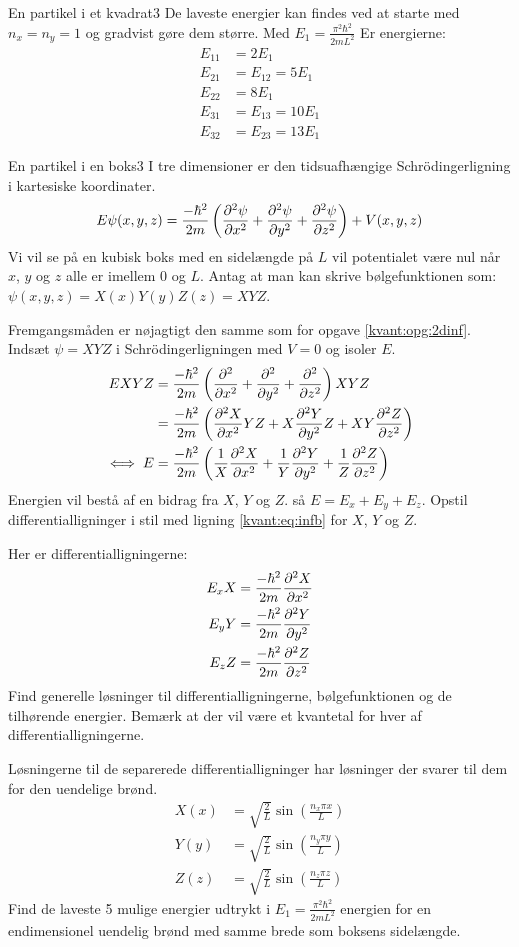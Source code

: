\begin{opgave}{En partikel i et kvadrat}{3}
De laveste energier kan findes ved at starte med $n_x = n_y = 1$ og gradvist gøre dem større. Med $E_1 = \frac{\pi^2\hbar^2}{2mL^2}$ Er energierne:
\begin{align*}
    E_{11} &= 2E_1\\
    E_{21} &= E_{12} = 5E_1\\
    E_{22} &= 8E_1\\
    E_{31} &= E_{13} = 10E_1\\
    E_{32} &= E_{23} = 13E_1
\end{align*}
\end{opgave}


\begin{opgave}{En partikel i en boks}{3}
I tre dimensioner er den tidsuafhængige Schrödingerligning i kartesiske koordinater.
$$
E\psi(x,y,z) = \frac{-\hbar^2}{2m}\left(\pdif[2]{x}\psi +\pdif[2]{y}\psi+\pdif[2]{z}\psi\right) + V(x,y,z)
$$
Vi vil se på en kubisk boks med en sidelængde på $L$ vil potentialet være nul når $x$, $y$ og $z$ alle er imellem 0 og $L$.
Antag at man kan skrive bølgefunktionen som: $\psi(x,y,z) = X(x)Y(y)Z(z) = XYZ$.

Fremgangsmåden er nøjagtigt den samme som for opgave \ref{kvant:opg:2dinf}.
\opg Indsæt $\psi = XYZ$ i Schrödingerligningen med $V=0$ og isoler $E$.
\begin{align*}
EXYZ &= \frac{-\hbar^2}{2m}\left(\pdif[2]{x}{}+\pdif[2]{y}{}+\pdif[2]{z}{}\right)XYZ\\
&= \frac{-\hbar^2}{2m}\left(\pdif[2]{x}{X}YZ+X\pdif[2]{y}{Y}Z+XY\pdif[2]{z}{Z}\right)\\
\iff E&= \frac{-\hbar^2}{2m}\left(\frac{1}{X}\pdif[2]{x}{X}+\frac{1}{Y}\pdif[2]{y}{Y}+\frac{1}{Z}\pdif[2]{z}{Z}\right)
\end{align*}
\opg Energien vil bestå af en bidrag fra $X$, $Y$ og $Z$. så $E=E_x+E_y+E_z$. Opstil differentialligninger i stil med ligning \eqref{kvant:eq:infb} for $X$, $Y$ og $Z$.

Her er differentialligningerne:
\begin{align*}
    E_xX &= \frac{-\hbar^2}{2m}\pdif[2]{x}{X}\\
    E_yY &= \frac{-\hbar^2}{2m}\pdif[2]{y}{Y}\\
    E_zZ &= \frac{-\hbar^2}{2m}\pdif[2]{z}{Z}
\end{align*}
\opg Find generelle løsninger til differentialligningerne, bølgefunktionen og de tilhørende energier. Bemærk at der vil være et kvantetal for hver af differentialligningerne. 

Løsningerne til de separerede differentialligninger har løsninger der svarer til dem for den uendelige brønd.
\begin{align*}
    X(x)&=\sqrt{\frac{2}{L}}\sin\left(\frac{n_x\pi x}{L}\right)\\
    Y(y)&=\sqrt{\frac{2}{L}}\sin\left(\frac{n_y\pi y}{L}\right)\\
    Z(z)&=\sqrt{\frac{2}{L}}\sin\left(\frac{n_z\pi z}{L}\right)
\end{align*}
\opg Find de laveste 5 mulige energier udtrykt i $E_1 = \frac{\pi^2\hbar^2}{2mL^2}$ energien for en  endimensionel uendelig brønd med samme brede som boksens sidelængde.


\end{opgave}
